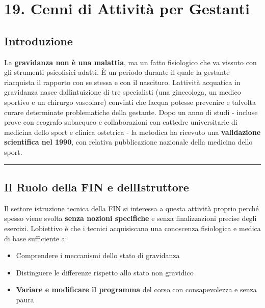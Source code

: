 \documentclass[a4paper,11pt]{article}
\providecommand{\tightlist}{%
  \setlength{\itemsep}{0pt}\setlength{\parskip}{0pt}}
\begin{document}
\section{19. Cenni di Attività per
  Gestanti}\label{cenni-di-attivituxe0-per-gestanti}

\subsection{Introduzione}\label{introduzione-18}

La \textbf{gravidanza non è una malattia}, ma un fatto fisiologico che
va vissuto con gli strumenti psicofisici adatti. È un periodo durante il
quale la gestante riacquista il rapporto con se stessa e con il
nascituro. L\textquotesingle attività acquatica in gravidanza nasce
dall\textquotesingle intuizione di tre specialisti (una ginecologa, un
medico sportivo e un chirurgo vascolare) convinti che
l\textquotesingle acqua potesse prevenire e talvolta curare determinate
problematiche della gestante. Dopo un anno di studi - incluse prove con
ecografo subacqueo e collaborazioni con cattedre universitarie di
medicina dello sport e clinica ostetrica - la metodica ha ricevuto una
\textbf{validazione scientifica nel 1990}, con relativa pubblicazione
nazionale della medicina dello sport.

\begin{center}\rule{0.5\linewidth}{0.5pt}\end{center}

\subsection{Il Ruolo della FIN e
      dell\textquotesingle Istruttore}\label{il-ruolo-della-fin-e-dellistruttore}

Il settore istruzione tecnica della FIN si interessa a questa attività
proprio perché spesso viene svolta \textbf{senza nozioni specifiche} e
senza finalizzazioni precise degli esercizi. L\textquotesingle obiettivo
è che i tecnici acquisiscano una conoscenza fisiologica e medica di base
sufficiente a:

\begin{itemize}
      \tightlist
      \item
            Comprendere i meccanismi dello stato di gravidanza
      \item
            Distinguere le differenze rispetto allo stato non gravidico
      \item
            \textbf{Variare e modificare il programma} del corso con
            consapevolezza e senza paura
\end{itemize}
\end{document}
